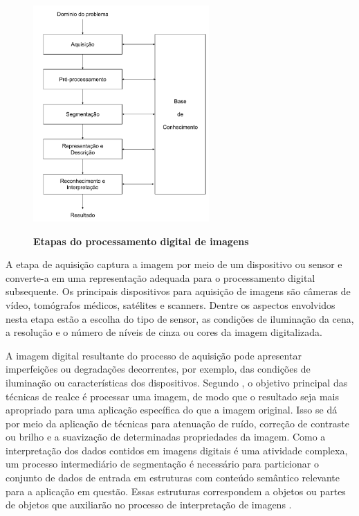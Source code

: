 \documentclass[12pt,oneside,a4paper,english,french,spanish,brazil,]{abntex2}
\begin{document}
\begin{figure}[ht]
\centering
\caption{\textbf{Etapas do processamento digital de imagens}}
\includegraphics[width=0.6\textwidth]{imagens/PDI_Etapas_PDI.pdf}
\label{fig:PDI_Etapas_PDI}
\end{figure}

A etapa de aquisição captura a imagem por meio de um dispositivo ou sensor e converte-a em uma representação adequada para o processamento digital subsequente. Os principais dispositivos para aquisição de imagens são câmeras de vídeo, tomógrafos médicos, satélites e scanners. Dentre os aspectos envolvidos nesta etapa estão a escolha do tipo de sensor, as condições de iluminação da cena, a resolução e o número de níveis de cinza ou cores da imagem digitalizada.

A imagem digital resultante do processo de aquisição pode apresentar imperfeições ou degradações decorrentes, por exemplo, das condições de iluminação ou características dos dispositivos. Segundo \citet{gonzalez:2012}, o objetivo principal das técnicas de realce é processar uma imagem, de modo que o resultado seja mais apropriado para uma aplicação específica do que a imagem original. Isso se dá por meio da aplicação de técnicas para atenuação de ruído, correção de contraste ou brilho e a suavização de determinadas propriedades da imagem.
Como a interpretação dos dados contidos em imagens digitais é uma atividade complexa, um processo intermediário de segmentação é necessário para particionar o conjunto de dados de entrada em estruturas com conteúdo semântico relevante para a aplicação em questão. Essas estruturas correspondem a objetos ou partes de objetos que auxiliarão no processo de interpretação de imagens \cite{pedrini:2008}.
\end{document}
